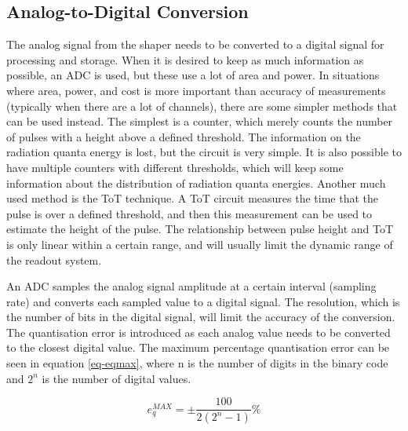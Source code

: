 \documentclass[../main/thesis.tex]{subfiles}
\begin{document}

\subsection{Analog-to-Digital Conversion}
\label{t-adc}
The analog signal from the shaper needs to be converted to a digital signal for processing and storage. When it is desired to keep as much information as possible, an \gls{ADC} is used, but these use a lot of area and power. In situations where area, power, and cost is more important than accuracy of measurements (typically when there are a lot of channels), there are some simpler methods that can be used instead. The simplest is a counter, which merely counts the number of pulses with a height above a defined threshold. The information on the radiation quanta energy is lost, but the circuit is very simple. It is also possible to have multiple counters with different thresholds, which will keep some information about the distribution of radiation quanta energies. Another much used method is the \gls{ToT} technique. A \gls{ToT} circuit measures the time that the pulse is over a defined threshold, and then this measurement can be used to estimate the height of the pulse. The relationship between pulse height and \gls{ToT} is only linear within a certain range, and will usually limit the dynamic range of the readout system. \citep[chap. 6]{ToT}


An \gls{ADC} samples the analog signal amplitude at a certain interval (sampling rate) and converts each sampled value to a digital signal. The resolution, which is the number of bits in the digital signal, will limit the accuracy of the conversion. The quantisation error is introduced as each analog value needs to be converted to the closest digital value. The maximum percentage quantisation error can be seen in equation \ref{eq-eqmax}, where n is the number of digits in the binary code and $2^n$ is the number of digital values. \citep[chap. 10]{Bentley}

\begin{equation}%
e_q^{MAX} = \pm \frac{100}{2(2^n - 1)}\%
\label{eq-eqmax}
\end{equation}
\end{document}
